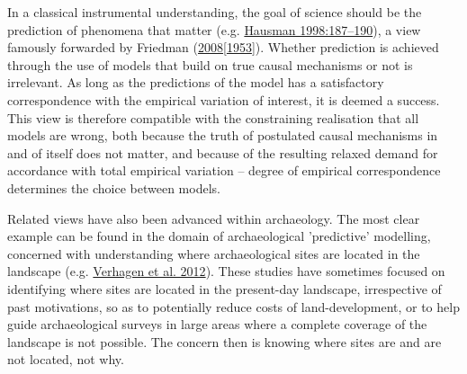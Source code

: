 \documentclass[
  a4paper,
  oneside]{uiophdthesis}
\begin{document}
In a classical instrumental understanding, the goal of science should be the prediction of phenomena that matter (e.g. \protect\hyperlink{ref-hausman1998}{Hausman 1998:187--190}), a view famously forwarded by Friedman (\protect\hyperlink{ref-friedman1953}{2008{[}1953{]}}). Whether prediction is achieved through the use of models that build on true causal mechanisms or not is irrelevant. As long as the predictions of the model has a satisfactory correspondence with the empirical variation of interest, it is deemed a success. This view is therefore compatible with the constraining realisation that all models are wrong, both because the truth of postulated causal mechanisms in and of itself does not matter, and because of the resulting relaxed demand for accordance with total empirical variation -- degree of empirical correspondence determines the choice between models.

Related views have also been advanced within archaeology. The most clear example can be found in the domain of archaeological 'predictive' modelling, concerned with understanding where archaeological sites are located in the landscape (e.g. \protect\hyperlink{ref-verhagen2012}{Verhagen et al. 2012}). These studies have sometimes focused on identifying where sites are located in the present-day landscape, irrespective of past motivations, so as to potentially reduce costs of land-development, or to help guide archaeological surveys in large areas where a complete coverage of the landscape is not possible. The concern then is knowing where sites are and are not located, not why.
\end{document}
